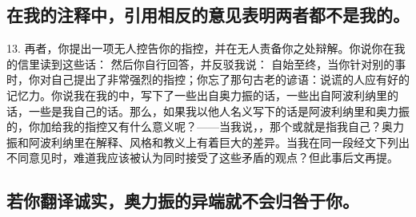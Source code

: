 
\subsection{在我的注释中，引用相反的意见表明两者都不是我的。}

13. 再者，你提出一项无人控告你的指控，并在无人责备你之处辩解。你说你在我的信里读到这些话： 然后你自行回答，并反驳我说： 自始至终，当你针对别的事时，你对自己提出了非常强烈的指控；你忘了那句古老的谚语：说谎的人应有好的记忆力。你说我在我的中，写下了一些出自奥力振的话，一些出自阿波利纳里的话，一些是我自己的话。那么，如果我以他人名义写下的话是阿波利纳里和奥力振的，你加给我的指控又有什么意义呢？——当我说，，那个或就是指我自己？奥力振和阿波利纳里在解释、风格和教义上有着巨大的差异。当我在同一段经文下列出不同意见时，难道我应该被认为同时接受了这些矛盾的观点？但此事后文再提。\par


\subsection{若你翻译诚实，奥力振的异端就不会归咎于你。}

